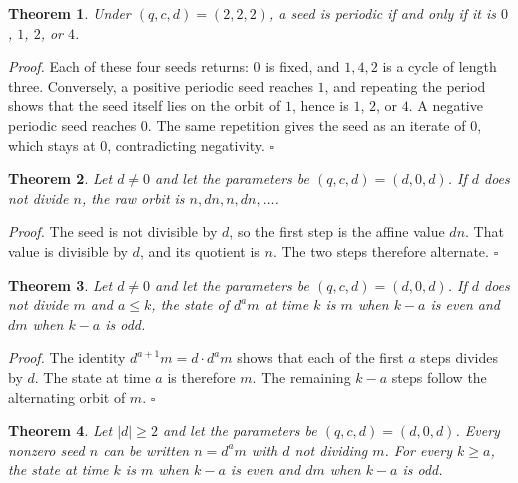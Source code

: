 \documentclass[11pt,letterpaper]{article}
\newtheorem{theorem}{Theorem}
\newenvironment{proof}{\noindent\textit{Proof.}}{\hfill\(\square\)}
\begin{document}
\begin{theorem}
\label{thm:sharedperiodic}
Under \((q,c,d)=(2,2,2)\), a seed is periodic if and only if it is \(0\), \(1\), \(2\), or \(4\).
\end{theorem}

\begin{proof}
Each of these four seeds returns: \(0\) is fixed, and \(1,4,2\) is a cycle of length three. Conversely, a positive periodic seed reaches \(1\), and repeating the period shows that the seed itself lies on the orbit of \(1\), hence is \(1\), \(2\), or \(4\). A negative periodic seed reaches \(0\). The same repetition gives the seed as an iterate of \(0\), which stays at \(0\), contradicting negativity.
\end{proof}

\begin{theorem}
\label{thm:zerooffset}
Let \(d\ne 0\) and let the parameters be \((q,c,d)=(d,0,d)\). If \(d\) does not divide \(n\), the raw orbit is \(n,dn,n,dn,\ldots\).
\end{theorem}

\begin{proof}
The seed is not divisible by \(d\), so the first step is the affine value \(dn\). That value is divisible by \(d\), and its quotient is \(n\). The two steps therefore alternate.
\end{proof}

\begin{theorem}
\label{thm:zerooffsettail}
Let \(d\ne 0\) and let the parameters be \((q,c,d)=(d,0,d)\). If \(d\) does not divide \(m\) and \(a\le k\), the state of \(d^{a}m\) at time \(k\) is \(m\) when \(k-a\) is even and \(dm\) when \(k-a\) is odd.
\end{theorem}

\begin{proof}
The identity \(d^{a+1}m=d\cdot d^{a}m\) shows that each of the first \(a\) steps divides by \(d\). The state at time \(a\) is therefore \(m\). The remaining \(k-a\) steps follow the alternating orbit of \(m\).
\end{proof}

\begin{theorem}
\label{thm:zerooffsetall}
Let \(|d|\ge 2\) and let the parameters be \((q,c,d)=(d,0,d)\). Every nonzero seed \(n\) can be written \(n=d^{a}m\) with \(d\) not dividing \(m\). For every \(k\ge a\), the state at time \(k\) is \(m\) when \(k-a\) is even and \(dm\) when \(k-a\) is odd.
\end{theorem}
\end{document}
